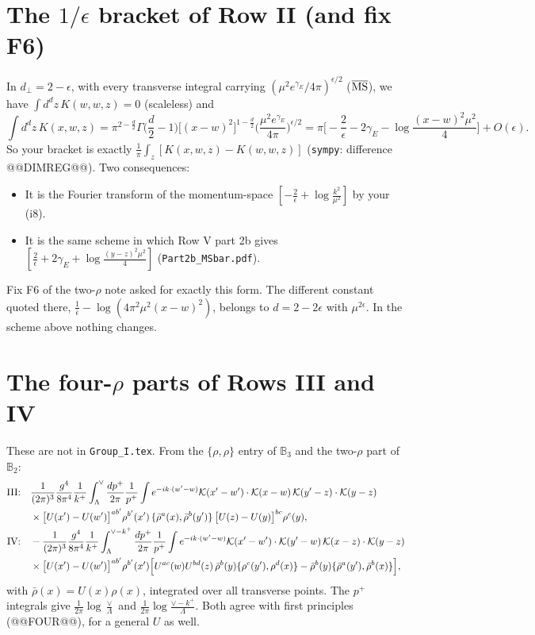 \documentclass[10pt]{article}
\numberwithin{equation}{section}
\def\mf#1{\mathbb{#1}}
\newcommand{\KK}{\mathcal K}
\begin{document}
\section{The \texorpdfstring{$1/\epsilon$}{1/epsilon} bracket of Row II (and fix F6)}\label{sec:F6}
In $d_\perp=2-\epsilon$, with every transverse integral carrying $(\mu^2e^{\gamma_E}/4\pi)^{\epsilon/2}$ ($\overline{\rm MS}$), we have $\int d^dz\,K(w,w,z)=0$ (scaleless) and
\begin{equation}
\int d^dz\,K(x,w,z)=\pi^{2-\frac d2}\Gamma\Big(\frac d2-1\Big)\big[(x-w)^2\big]^{1-\frac d2}\Big(\frac{\mu^2e^{\gamma_E}}{4\pi}\Big)^{\epsilon/2}=\pi\Big[-\frac2\epsilon-2\gamma_E-\log\frac{(x-w)^2\mu^2}{4}\Big]+O(\epsilon).
\end{equation}
So your bracket is exactly $\frac1\pi\int_z[K(x,w,z)-K(w,w,z)]$ (\texttt{sympy}: difference @@DIMREG@@). Two consequences:
\begin{itemize}
\item It is the Fourier transform of the momentum-space $[-\frac2\epsilon+\log\frac{k^2}{\mu^2}]$ by your (i8).
\item It is the same scheme in which Row V part 2b gives $[\frac2\epsilon+2\gamma_E+\log\frac{(y-z)^2\mu^2}{4}]$ (\texttt{Part2b\_MSbar.pdf}).
\end{itemize}
Fix F6 of the two-$\rho$ note asked for exactly this form. The different constant quoted there, $\frac1{\bar\epsilon}-\log(4\pi^2\mu^2(x-w)^2)$, belongs to $d=2-2\epsilon$ with $\mu^{2\epsilon}$. In the scheme above nothing changes.

\section{The four-\texorpdfstring{$\rho$}{rho} parts of Rows III and IV}\label{sec:four}
These are not in \texttt{Group\_I.tex}. From the $\{\rho,\rho\}$ entry of $\mf B_3$ and the two-$\rho$ part of $\mf B_2$:
\begin{align}
\text{III:}\quad&\frac{1}{(2\pi)^3}\frac{g^4}{8\pi^4}\frac{1}{k^+}\int_\Lambda^\vee\frac{dp^+}{2\pi}\frac{1}{p^+}\int e^{-ik\cdot(w'-w)}\KK(x'-w')\cdot\KK(x-w)\,\KK(y'-z)\cdot\KK(y-z)\notag\\
&\times\big[U(x')-U(w')\big]^{ab'}\rho^{b'}(x')\,\{\bar\rho^a(x),\bar\rho^b(y')\}\,\big[U(z)-U(y)\big]^{bc}\rho^c(y),\\
\text{IV:}\quad&-\frac{1}{(2\pi)^3}\frac{g^4}{8\pi^4}\frac{1}{k^+}\int_\Lambda^{\vee-k^+}\frac{dp^+}{2\pi}\frac{1}{p^+}\int e^{-ik\cdot(w'-w)}\KK(x'-w')\cdot\KK(y'-w)\,\KK(x-z)\cdot\KK(y-z)\notag\\
&\times\big[U(x')-U(w')\big]^{ab'}\rho^{b'}(x')\Big[U^{ac}(w)U^{bd}(z)\,\bar\rho^b(y)\{\rho^c(y'),\rho^d(x)\}-\bar\rho^b(y)\{\bar\rho^a(y'),\bar\rho^b(x)\}\Big],
\end{align}
with $\bar\rho(x)=U(x)\rho(x)$, integrated over all transverse points. The $p^+$ integrals give $\frac{1}{2\pi}\log\frac{\vee}{\Lambda}$ and $\frac{1}{2\pi}\log\frac{\vee-k^+}{\Lambda}$. Both agree with first principles (@@FOUR@@), for a general $U$ as well.
\end{document}
